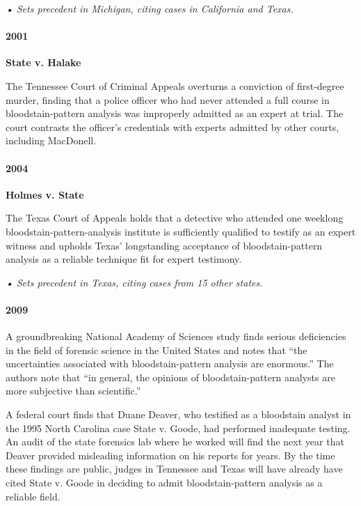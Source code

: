 \emph{• Sets precedent in Michigan, citing cases in California and
Texas.}

\hypertarget{2001}{%
\paragraph{2001}\label{2001}}

\textbf{State v. Halake}

The Tennessee Court of Criminal Appeals overturns a conviction of
first-degree murder, finding that a police officer who had never
attended a full course in bloodstain-pattern analysis was improperly
admitted as an expert at trial. The court contrasts the officer's
credentials with experts admitted by other courts, including MacDonell.

\hypertarget{2004}{%
\paragraph{2004}\label{2004}}

\textbf{Holmes v. State}

The Texas Court of Appeals holds that a detective who attended one
weeklong bloodstain-pattern-analysis institute is sufficiently qualified
to testify as an expert witness and upholds Texas' longstanding
acceptance of bloodstain-pattern analysis as a reliable technique fit
for expert testimony.

\emph{• Sets precedent in Texas, citing cases from 15 other states.}

\hypertarget{2009}{%
\paragraph{2009}\label{2009}}

A groundbreaking National Academy of Sciences study finds serious
deficiencies in the field of forensic science in the United States and
notes that ``the uncertainties associated with bloodstain-pattern
analysis are enormous.'' The authors note that ``in general, the
opinions of bloodstain-pattern analysts are more subjective than
scientific.''

A federal court finds that Duane Deaver, who testified as a bloodstain
analyst in the 1995 North Carolina case State v. Goode, had performed
inadequate testing. An audit of the state forensics lab where he worked
will find the next year that Deaver provided misleading information on
his reports for years. By the time these findings are public, judges in
Tennessee and Texas will have already have cited State v. Goode in
deciding to admit bloodstain-pattern analysis as a reliable field.

